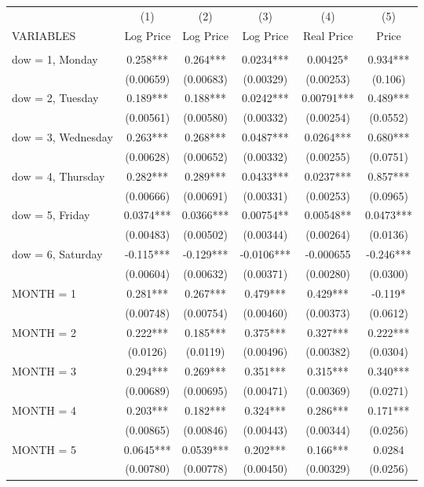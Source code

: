 \begin{tabular}{lccccc} \hline
 & (1) & (2) & (3) & (4) & (5) \\
VARIABLES & Log Price & Log Price & Log Price & Real Price & Price \\ \hline
 &  &  &  &  &  \\
dow = 1, Monday & 0.258*** & 0.264*** & 0.0234*** & 0.00425* & 0.934*** \\
 & (0.00659) & (0.00683) & (0.00329) & (0.00253) & (0.106) \\
dow = 2, Tuesday & 0.189*** & 0.188*** & 0.0242*** & 0.00791*** & 0.489*** \\
 & (0.00561) & (0.00580) & (0.00332) & (0.00254) & (0.0552) \\
dow = 3, Wednesday & 0.263*** & 0.268*** & 0.0487*** & 0.0264*** & 0.680*** \\
 & (0.00628) & (0.00652) & (0.00332) & (0.00255) & (0.0751) \\
dow = 4, Thursday & 0.282*** & 0.289*** & 0.0433*** & 0.0237*** & 0.857*** \\
 & (0.00666) & (0.00691) & (0.00331) & (0.00253) & (0.0965) \\
dow = 5, Friday & 0.0374*** & 0.0366*** & 0.00754** & 0.00548** & 0.0473*** \\
 & (0.00483) & (0.00502) & (0.00344) & (0.00264) & (0.0136) \\
dow = 6, Saturday & -0.115*** & -0.129*** & -0.0106*** & -0.000655 & -0.246*** \\
 & (0.00604) & (0.00632) & (0.00371) & (0.00280) & (0.0300) \\
MONTH = 1 & 0.281*** & 0.267*** & 0.479*** & 0.429*** & -0.119* \\
 & (0.00748) & (0.00754) & (0.00460) & (0.00373) & (0.0612) \\
MONTH = 2 & 0.222*** & 0.185*** & 0.375*** & 0.327*** & 0.222*** \\
 & (0.0126) & (0.0119) & (0.00496) & (0.00382) & (0.0304) \\
MONTH = 3 & 0.294*** & 0.269*** & 0.351*** & 0.315*** & 0.340*** \\
 & (0.00689) & (0.00695) & (0.00471) & (0.00369) & (0.0271) \\
MONTH = 4 & 0.203*** & 0.182*** & 0.324*** & 0.286*** & 0.171*** \\
 & (0.00865) & (0.00846) & (0.00443) & (0.00344) & (0.0256) \\
MONTH = 5 & 0.0645*** & 0.0539*** & 0.202*** & 0.166*** & 0.0284 \\
 & (0.00780) & (0.00778) & (0.00450) & (0.00329) & (0.0256) \\

\end{tabular}
